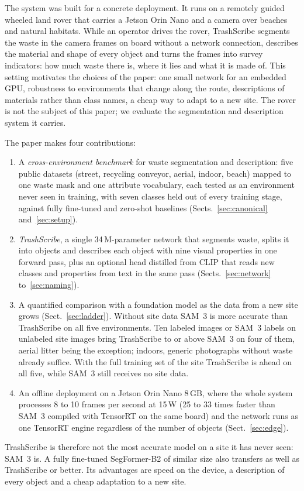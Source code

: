 \documentclass[pdflatex,sn-basic,Numbered]{sn-jnl}%
\newcommand{\trashscribe}{TrashScribe}
\begin{document}
The system was built for a concrete deployment. It runs on a remotely guided wheeled land rover that carries a Jetson Orin Nano and a camera over beaches and natural habitats. While an operator drives the rover, \trashscribe{} segments the waste in the camera frames on board without a network connection, describes the material and shape of every object and turns the frames into survey indicators: how much waste there is, where it lies and what it is made of. This setting motivates the choices of the paper: one small network for an embedded GPU, robustness to environments that change along the route, descriptions of materials rather than class names, a cheap way to adapt to a new site. The rover is not the subject of this paper; we evaluate the segmentation and description system it carries.

The paper makes four contributions:
\begin{enumerate}
\item A \emph{cross-environment benchmark} for waste segmentation and description: five public datasets (street, recycling conveyor, aerial, indoor, beach) mapped to one waste mask and one attribute vocabulary, each tested as an environment never seen in training, with seven classes held out of every training stage, against fully fine-tuned and zero-shot baselines (Sects.~\ref{sec:canonical} and~\ref{sec:setup}).
\item \emph{\trashscribe{}}, a single 34\,M-parameter network that segments waste, splits it into objects and describes each object with nine visual properties in one forward pass, plus an optional head distilled from CLIP that reads new classes and properties from text in the same pass (Sects.~\ref{sec:network} to~\ref{sec:naming}).
\item A quantified comparison with a foundation model as the data from a new site grows (Sect.~\ref{sec:ladder}). Without site data SAM~3 is more accurate than \trashscribe{} on all five environments. Ten labeled images or SAM~3 labels on unlabeled site images bring \trashscribe{} to or above SAM~3 on four of them, aerial litter being the exception; indoors, generic photographs without waste already suffice. With the full training set of the site \trashscribe{} is ahead on all five, while SAM~3 still receives no site data.
\item An offline deployment on a Jetson Orin Nano 8\,GB, where the whole system processes 8 to 10 frames per second at 15\,W (25 to 33 times faster than SAM~3 compiled with TensorRT on the same board) and the network runs as one TensorRT engine regardless of the number of objects (Sect.~\ref{sec:edge}).
\end{enumerate}
\trashscribe{} is therefore not the most accurate model on a site it has never seen: SAM~3 is. A fully fine-tuned SegFormer-B2 of similar size also transfers as well as \trashscribe{} or better. Its advantages are speed on the device, a description of every object and a cheap adaptation to a new site.
\end{document}
